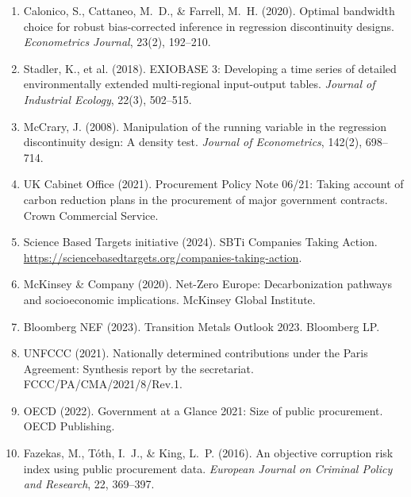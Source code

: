 \documentclass[11pt]{article}
\begin{document}
\begin{enumerate}
\item Calonico, S., Cattaneo, M.~D., \& Farrell, M.~H. (2020). Optimal bandwidth choice for robust bias-corrected inference in regression discontinuity designs. \textit{Econometrics Journal}, 23(2), 192--210.

\item Stadler, K., et al. (2018). EXIOBASE 3: Developing a time series of detailed environmentally extended multi-regional input-output tables. \textit{Journal of Industrial Ecology}, 22(3), 502--515.

\item McCrary, J. (2008). Manipulation of the running variable in the regression discontinuity design: A density test. \textit{Journal of Econometrics}, 142(2), 698--714.

\item UK Cabinet Office (2021). Procurement Policy Note 06/21: Taking account of carbon reduction plans in the procurement of major government contracts. Crown Commercial Service.

\item Science Based Targets initiative (2024). SBTi Companies Taking Action. \url{https://sciencebasedtargets.org/companies-taking-action}.

\item McKinsey \& Company (2020). Net-Zero Europe: Decarbonization pathways and socioeconomic implications. McKinsey Global Institute.

\item Bloomberg NEF (2023). Transition Metals Outlook 2023. Bloomberg LP.

\item UNFCCC (2021). Nationally determined contributions under the Paris Agreement: Synthesis report by the secretariat. FCCC/PA/CMA/2021/8/Rev.1.

\item OECD (2022). Government at a Glance 2021: Size of public procurement. OECD Publishing.

\item Fazekas, M., T\'{o}th, I.~J., \& King, L.~P. (2016). An objective corruption risk index using public procurement data. \textit{European Journal on Criminal Policy and Research}, 22, 369--397.
\end{enumerate}
\end{document}
